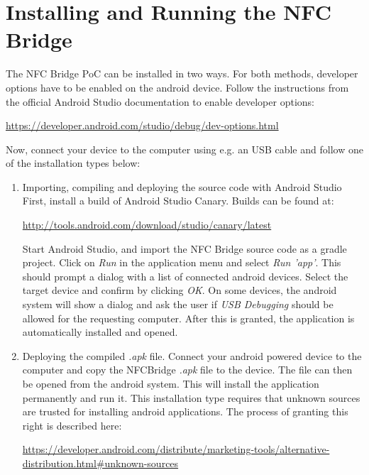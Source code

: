 \section{Installing and Running the NFC Bridge}
The NFC Bridge PoC can be installed in two ways. For both methods, developer options have to be enabled on the android device. Follow the instructions from the official Android Studio documentation to enable developer options:
\begin{framed}
\url{
https://developer.android.com/studio/debug/dev-options.html
}
\end{framed}
Now, connect your device to the computer using e.g. an USB cable and follow one of the installation types below:
\begin{enumerate}
\item Importing, compiling and deploying the source code with Android Studio
First, install a build of Android Studio Canary. Builds can be found at:
\begin{framed}
\url{http://tools.android.com/download/studio/canary/latest}
\end{framed}
Start Android Studio, and import the NFC Bridge source code as a gradle project. Click on \textit{Run} in the application menu and select \textit{Run 'app'}. This should prompt a dialog with a list of connected android devices. Select the target device and confirm by clicking \textit{OK}.
On some devices, the android system will show a dialog and ask the user if \textit{USB Debugging} should be allowed for the requesting computer.
After this is granted, the application is automatically installed and opened.
\item Deploying the compiled \textit{.apk} file.
Connect your android powered device to the computer and copy the NFCBridge \textit{.apk} file to the device. The file can then be opened from the android system. This will install the application permanently and run it.
This installation type requires that unknown sources are trusted for installing android applications. The process of granting this right is described here:
\begin{framed}\url{https://developer.android.com/distribute/marketing-tools/alternative-distribution.html#unknown-sources}
\end{framed}
\end{enumerate}

